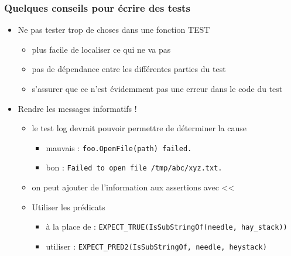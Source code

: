 \begin{frame}[fragile]
\frametitle{Quelques conseils pour écrire des tests}
  \begin{itemize}
  \itemsep1pt\parskip0pt
  \item
    Ne pas tester trop de choses dans une fonction TEST

    \begin{itemize}
    \itemsep1pt\parskip0pt
    \item
      plus facile de localiser ce qui ne va pas
    \item
      pas de dépendance entre les différentes parties du test
    \item
      s'assurer que ce n'est évidemment pas une erreur dans le code du
      test
    \end{itemize}
  \item
    Rendre les messages informatifs !

    \begin{itemize}
    \itemsep1pt\parskip0pt
    \item
      le test log devrait pouvoir permettre de déterminer la cause
      \begin{itemize}
    \item
      mauvais : \texttt{foo.OpenFile(path) failed.}
    \item
      bon : \texttt{Failed to open file /tmp/abc/xyz.txt.}
      \end{itemize}
    \item
      on peut ajouter de l'information aux assertions avec
      \textless{}\textless{}
    \item
      Utiliser les prédicats
	\begin{itemize}
      \item
        à la place de : \texttt{EXPECT\_TRUE(IsSubStringOf(needle, hay\_stack))}
      \item
        utiliser : \texttt{EXPECT\_PRED2(IsSubStringOf, needle, heystack)}
	\end{itemize}
    \end{itemize}
  \end{itemize}

\end{frame}

